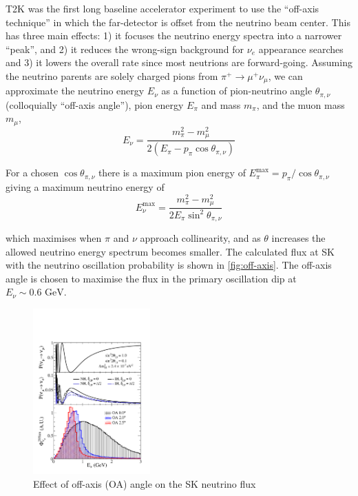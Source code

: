 T2K was the first long baseline accelerator experiment to use the ``off-axis technique'' in which the far-detector is offset from the neutrino beam center\cite{off_axis}. This has three main effects: 1) it focuses the neutrino energy spectra into a narrower ``peak'', and 2) it reduces the wrong-sign background for $\nu_e$ appearance searches and 3) it lowers the overall rate since most neutrions are forward-going. Assuming the neutrino parents are solely charged pions from $\pi^+\rightarrow\mu^+\nu_\mu$, we can approximate the neutrino energy $E_\nu$ as a function of pion-neutrino angle $\theta_{\pi,\nu}$ (colloquially ``off-axis angle''), pion energy $E_\pi$ and mass $m_\pi$, and the muon mass $m_\mu$,
\begin{equation}
	E_\nu = \frac{m^2_\pi-m^2_\mu}{2\left( E_\pi - p_\pi \cos \theta_{\pi,\nu} \right)} 
\end{equation}

For a chosen $\cos \theta_{\pi,\nu}$ there is a maximum pion energy of $E_\pi^\text{max} = p_\pi/\cos\theta_{\pi,\nu}$ giving a maximum neutrino energy of
\begin{equation}
	E_\nu^\text{max} = \frac{m^2_\pi-m^2_\mu}{2E_\pi \sin^2 \theta_{\pi,\nu}} 
\end{equation}

\noindent which maximises when $\pi$ and $\nu$ approach collinearity, and as $\theta$ increases the allowed neutrino energy spectrum becomes smaller. The calculated flux at SK with the neutrino oscillation probability is shown in \autoref{fig:off-axis}. The off-axis angle is chosen to maximise the flux in the primary oscillation dip at $E_\nu \sim 0.6\text{ GeV}$.
\begin{figure}[h]
	\includegraphics[width=0.4\textwidth, trim={0mm 0mm 0mm 0mm}, clip,page=1]{figures/det_chap/oaeffect_pnue_pnumu_flux}
	\caption{Effect of off-axis (OA) angle on the SK neutrino flux}
	\label{fig:off-axis}
\end{figure}

